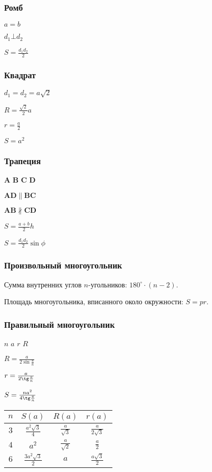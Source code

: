 \subsubsection{Ромб}

$ a = b $

$ d_1 \bot d_2 $

$ S = \frac{d_1 d_2}{2} $

\subsubsection{Квадрат}

$ d_1 = d_2 = a\sqrt{2} $

$ R = \frac{\sqrt{2}}{2} a $

$ r = \frac{a}{2} $

$ S = a^2 $

\subsubsection{Трапеция}

$\boldsymbol{A}$
$\boldsymbol{B}$
$\boldsymbol{C}$
$\boldsymbol{D}$

$ \boldsymbol{AD} \parallel \boldsymbol{BC} $

$ \boldsymbol{AB} \nparallel \boldsymbol{CD} $

$ S = \frac{a + b}{2} h $

$ S = \frac{d_1 d_2}{2} \sin \phi $

\subsubsection{Произвольный многоугольник}

Сумма внутренних углов $n$-угольников: $ 180^{\circ}\cdot (n-2) $.

Площадь многоугольника, вписанного около окружности: $S = p r$.

\subsubsection{Правильный многоугольник}

$n$
$a$
$r$
$R$

$ R = \frac{a}{2\sin\frac{\pi}{n}} $

$ r = \frac{a}{2\tg\frac{\pi}{n}} $

$ S =  \frac{n a^2}{4\tg\frac{\pi}{n}} $

\begin{tabu}[t]{||c||c||c|c||}
	\hline
		$ n $ & $ S(a) $ & $ R(a) $ & $ r(a) $ \\
	\hline
	\hline
		$ 3 $ & $ \frac{a^2 \sqrt{3}}{4} $ & $ \frac{a}{\sqrt{3}} $ & $ \frac{a}{2 \sqrt{3}} $ \\
	\hline
		$ 4 $ & $ a^2 $ & $ \frac{a}{\sqrt{2}} $ & $ \frac{a}{2} $ \\
	\hline
		$ 6 $ & $ \frac{3 a^2 \sqrt{3}}{2} $ & $ a $ & $ \frac{a \sqrt{3}}{2} $ \\
	\hline
\end{tabu}

